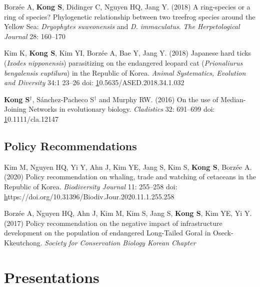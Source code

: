 \documentclass[11pt]{article}
\begin{document}
\begin{etaremune}
\item Borzée A,\textbf{ Kong S}, Didinger C, Nguyen HQ, Jang Y. (2018) A ring-species or a ring of species? Phylogenetic relationship between two treefrog species around the Yellow Sea: \textit{Dryophytes suweonensis }and \textit{D. immaculatus}. \textit{The Herpetological Journal} 28: 160–170 
\item Kim K, \textbf{Kong S}, Kim YI, Borzée A, Bae Y, Jang Y. (2018) Japanese hard ticks (\textit{Ixodes nipponensis}) parasitizing on the endangered leopard cat (\textit{Prionaliurus bengalensis euptilura}) in the Republic of Korea. \textit{Animal Systematics, Evolution and Diversity} 34:1 23–26 doi: \href{10.5635/ASED.2018.34.1.032}10.5635/ASED.2018.34.1.032
\item \textbf{Kong S}{$^\dag$}, Sánchez-Pacheco S{$^\dag$} and Murphy RW. (2016) On the use of Median-Joining Networks in evolutionary biology. \textit{Cladistics} 32: 691–699 doi: \href{https://doi.org/10.1111/cla.12147}10.1111/cla.12147

\end{etaremune}

\subsection*{Policy Recommendations}
\begin{etaremune}

\item Kim M, Nguyen HQ, Yi Y, Ahn J, Kim YE, Jang S, Kim S, \textbf{Kong S}, Borzée A. (2020) Policy recommendation on whaling, trade and watching of cetaceans in the Republic of Korea. \textit{Biodiversity Journal} 11: 255–258 doi: \href{https://doi.org/10.31396/Biodiv.Jour.2020.11.1.255.258}https://doi.org/10.31396/Biodiv.Jour.2020.11.1.255.258
\item Borzée A, Nguyen HQ, Ahn J, Kim M, Kim S, Jang S, \textbf{Kong S}, Kim YE, Yi Y. (2017) Policy recommendation on the negative impact of infrastructure development on the population of endangered Long-Tailed Goral in Oseck-Kkeutchong. \textit{Society for Conservation Biology Korean Chapter}

\end{etaremune}

\hspace{0pt}

\section*{Presentations}
\end{document}
